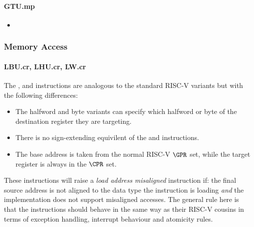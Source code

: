 \paragraph{GTU.mp}

\begin{itemize}
\item {}
\end{itemize}

\subsubsection{Memory Access}

\paragraph{LBU.cr, LHU.cr, LW.cr}

The ,  and  instructions are analogous to
the standard RISC-V variants but with the following differences:

\begin{itemize}
\item The halfword and byte variants can specify which halfword or byte of
      the destination register they are targeting.
\item There is no sign-extending equivilent of the  and 
      instructions.
\item The base address is taken from the normal RISC-V $\GPR$ set, while the
      target register is always in the $\CPR$ set.
\end{itemize}

These instructions will raise a {\em load address misaligned} instruction
if: the final source address is not aligned to the data type the instruction
is loading {\em and} the implementation does not support misaligned accesses.
The general rule here is that the  instructions should behave in
the same way as their RISC-V cousins in terms of exception handling,
interrupt behaviour and atomicity rules.

